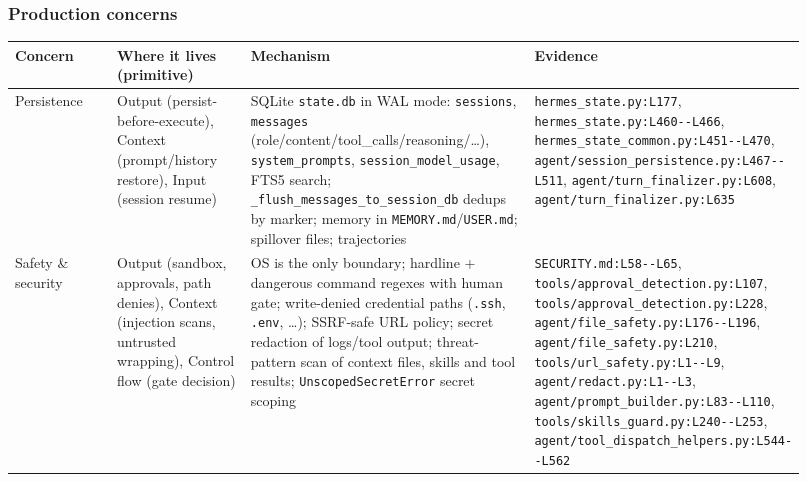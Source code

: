 \subsubsection*{Production concerns}
\begin{longtable}{@{}p{0.13\linewidth}p{0.17\linewidth}p{0.36\linewidth}p{0.26\linewidth}@{}}
\toprule \textbf{Concern} & \textbf{Where it lives (primitive)} & \textbf{Mechanism} & \textbf{Evidence} \\ \midrule \endhead
Persistence & Output (persist-before-execute), Context (prompt/history restore), Input (session resume) & SQLite \texttt{state.\allowbreak{}db} in WAL mode: \texttt{sessions}, \texttt{messages} (role/content/tool\_calls/reasoning/\ldots{}), \texttt{system\_\allowbreak{}prompts}, \texttt{session\_\allowbreak{}model\_\allowbreak{}usage}, FTS5 search; \texttt{\_\allowbreak{}flush\_\allowbreak{}messages\_\allowbreak{}to\_\allowbreak{}session\_\allowbreak{}db} dedups by marker; memory in \texttt{MEMORY.\allowbreak{}md}/\texttt{USER.\allowbreak{}md}; spillover files; trajectories & \texttt{hermes\_\allowbreak{}state.\allowbreak{}py:\allowbreak{}L177}, \texttt{hermes\_\allowbreak{}state.\allowbreak{}py:\allowbreak{}L460-\allowbreak{}-\allowbreak{}L466}, \texttt{hermes\_\allowbreak{}state\_\allowbreak{}common.\allowbreak{}py:\allowbreak{}L451-\allowbreak{}-\allowbreak{}L470}, \texttt{agent/\allowbreak{}session\_\allowbreak{}persistence.\allowbreak{}py:\allowbreak{}L467-\allowbreak{}-\allowbreak{}L511}, \texttt{agent/\allowbreak{}turn\_\allowbreak{}finalizer.\allowbreak{}py:\allowbreak{}L608}, \texttt{agent/\allowbreak{}turn\_\allowbreak{}finalizer.\allowbreak{}py:\allowbreak{}L635} \\
Safety \& security & Output (sandbox, approvals, path denies), Context (injection scans, untrusted wrapping), Control flow (gate decision) & OS is the only boundary; hardline + dangerous command regexes with human gate; write-denied credential paths (\texttt{.\allowbreak{}ssh}, \texttt{.\allowbreak{}env}, \ldots{}); SSRF-safe URL policy; secret redaction of logs/tool output; threat-pattern scan of context files, skills and tool results; \texttt{UnscopedSecretError} secret scoping & \texttt{SECURITY.\allowbreak{}md:\allowbreak{}L58-\allowbreak{}-\allowbreak{}L65}, \texttt{tools/\allowbreak{}approval\_\allowbreak{}detection.\allowbreak{}py:\allowbreak{}L107}, \texttt{tools/\allowbreak{}approval\_\allowbreak{}detection.\allowbreak{}py:\allowbreak{}L228}, \texttt{agent/\allowbreak{}file\_\allowbreak{}safety.\allowbreak{}py:\allowbreak{}L176-\allowbreak{}-\allowbreak{}L196}, \texttt{agent/\allowbreak{}file\_\allowbreak{}safety.\allowbreak{}py:\allowbreak{}L210}, \texttt{tools/\allowbreak{}url\_\allowbreak{}safety.\allowbreak{}py:\allowbreak{}L1-\allowbreak{}-\allowbreak{}L9}, \texttt{agent/\allowbreak{}redact.\allowbreak{}py:\allowbreak{}L1-\allowbreak{}-\allowbreak{}L3}, \texttt{agent/\allowbreak{}prompt\_\allowbreak{}builder.\allowbreak{}py:\allowbreak{}L83-\allowbreak{}-\allowbreak{}L110}, \texttt{tools/\allowbreak{}skills\_\allowbreak{}guard.\allowbreak{}py:\allowbreak{}L240-\allowbreak{}-\allowbreak{}L253}, \texttt{agent/\allowbreak{}tool\_\allowbreak{}dispatch\_\allowbreak{}helpers.\allowbreak{}py:\allowbreak{}L544-\allowbreak{}-\allowbreak{}L562} \\

\end{longtable}
